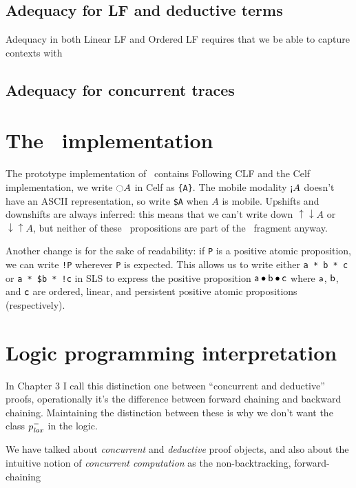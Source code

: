 \subsection{Adequacy for LF and deductive terms}

Adequacy in both Linear LF \cite{cervesato02linear} and Ordered LF 
\cite{polakow01ordered} requires that we be able to capture contexts
with 

\subsection{Adequacy for concurrent traces}


\section{The \sls~implementation}
\label{sec:prototype}

The prototype implementation of \sls~contains 
Following CLF and the Celf implementation, we write ${\ocircle}A$ in
Celf as \verb|{A}|. The mobile modality ${\gnab}A$ doesn't have an
ASCII representation, so write \verb|$A| when $A$ is
mobile. Upshifts and downshifts are always inferred: this means that
we can't write down ${\uparrow}{\downarrow}A$ or
${\downarrow}{\uparrow}A$, but neither of these \ollll~propositions
are part of the \sls~fragment anyway.

Another change is for the sake of readability: if \verb|P| is a
positive atomic proposition, we can write \verb|!P| wherever \verb|P|
is expected. This allows us to write either \verb|a * b * c| or
\verb|a * $b * !c| in SLS to express the positive proposition ${\sf a}
\mathbin{\bullet} {\sf b} \mathbin{\bullet} {\sf c}$ where ${\sf a}$, ${\sf b}$, and ${\sf c}$
are ordered, linear, and persistent positive atomic propositions
(respectively).

\section{Logic programming interpretation}
\label{sec:framework-logicprog}

In Chapter 3 I call this distinction one between ``concurrent and deductive''
proofs, operationally it's the difference between forward chaining 
and backward chaining. Maintaining the distinction between these is why
we don't want the class $p^-_{\it lax}$ in the logic.

We have talked about {\it concurrent} and {\it deductive} proof
objects, and also about the intuitive notion of {\it concurrent
  computation} as the non-backtracking, forward-chaining 


